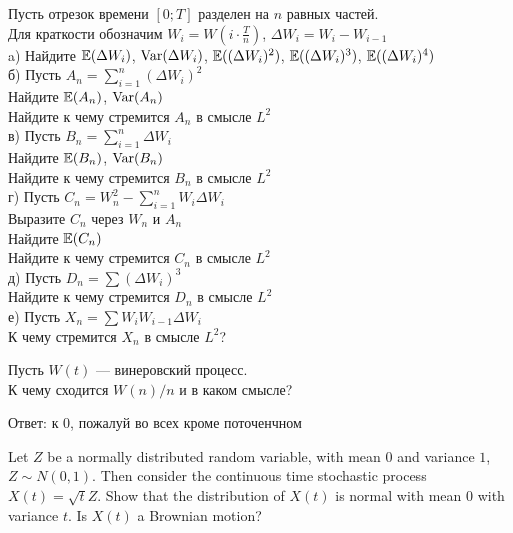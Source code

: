 \begin{solution}
\begin{solution}
\begin{solution}
\begin{solution}
\begin{solution}
\begin{solution}
\begin{solution}
\begin{solution}
\begin{solution}
\begin{solution}
{\begin{problem}
Пусть отрезок времени $[0;T]$ разделен на $n$ равных частей. \\
Для краткости обозначим $W_{i}=W(i\cdot \frac{T}{n})$, $\Delta W_{i}=W_{i}-W_{i-1}$ \\
a) Найдите $\mathbb{E}(\Delta W_{i})$, $\operatorname{Var}(\Delta W_{i})$, $\mathbb{E}((\Delta W_{i})^{2})$, $\mathbb{E}((\Delta W_{i})^{3})$, $\mathbb{E}((\Delta W_{i})^{4})$ \\
б) Пусть $A_{n}=\sum_{i=1}^{n}(\Delta W_{i})^{2}$ \\
Найдите $\mathbb{E}(A_{n})$, $\operatorname{Var}(A_{n})$ \\
Найдите к чему стремится $A_{n}$ в смысле $L^{2}$ \\
в) Пусть $B_{n}=\sum_{i=1}^{n}\Delta W_{i}$ \\
Найдите $\mathbb{E}(B_{n})$, $\operatorname{Var}(B_{n})$ \\
Найдите к чему стремится $B_{n}$ в смысле $L^{2}$ \\
г) Пусть $C_{n}=W_{n}^{2}-\sum_{i=1}^{n}W_{i}\Delta W_{i}$ \\
Выразите $C_{n}$ через $W_{n}$ и $A_{n}$ \\
Найдите $\mathbb{E}(C_{n})$ \\
Найдите к чему стремится $C_{n}$ в смысле $L^{2}$ \\
д) Пусть $D_{n}=\sum (\Delta W_{i})^{3}$ \\
Найдите к чему стремится $D_{n}$ в смысле $L^{2}$ \\
е) Пусть $X_{n}=\sum W_{i}W_{i-1}\Delta W_{i}$ \\
К чему стремится $X_{n}$ в смысле $L^{2}$? 
\end{problem} 
\begin{solution} 

\end{solution}

\begin{problem}
Пусть $W(t)$ --- винеровский процесс. \\
К чему сходится $W(n)/n$ и в каком смысле? 
\end{problem} 
\begin{solution} 
Ответ: к 0, пожалуй во всех кроме поточенчном 
\end{solution}

\begin{problem}
  Let $Z$ be a normally distributed random variable, with mean
  $0$ and variance $1$, $Z \sim N(0,1)$.  Then consider the continuous
  time stochastic process $X(t) = \sqrt{t} Z$. Show that the distribution of
  $X(t)$ is normal with mean $0$ with variance $t$.  Is $X(t)$ a
  Brownian motion?
\end{problem} 
\begin{solution} 


\end{solution}}
\end{solution}
\end{solution}
\end{solution}
\end{solution}
\end{solution}
\end{solution}
\end{solution}
\end{solution}
\end{solution}
\end{solution}

